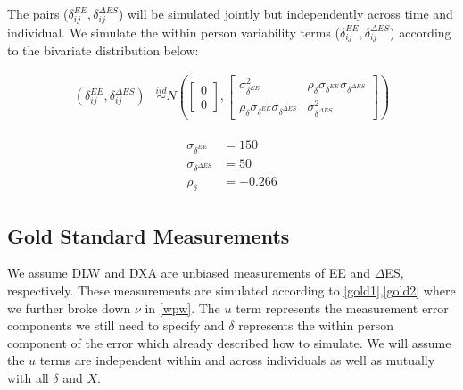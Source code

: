 \documentclass[11pt]{article}\usepackage[]{graphicx}\usepackage[]{color}
\begin{document}
The pairs ($\delta_{ij}^{EE},\delta_{ij}^{\Delta ES}$) will be simulated jointly  but independently across time and individual. We simulate the within person variability terms ($\delta_{ij}^{EE},\delta_{ij}^{\Delta ES}$) according to the bivariate distribution below:


\begin{align}
  \label{delta}
  (\delta_{ij}^{EE}, \delta_{ij}^{\Delta ES}) &\overset{iid}{\sim} N\left(
  \begin{bmatrix}
  0\\
  0
  \end{bmatrix}
  ,
  \begin{bmatrix}
  \sigma_{\delta^{EE}}^2 & \rho_{\delta}\sigma_{\delta^{EE}}\sigma_{\delta^{\Delta ES}} \\
   \rho_{\delta}\sigma_{\delta^{EE}}\sigma_{\delta^{\Delta ES}} & \sigma_{\delta^{\Delta ES}}^2
   \end{bmatrix}
  \right)
\end{align}


  \begin{align}
  \begin{split}
    \label{withinvar5}
  \sigma_{\delta^{EE}} &= 150\\
  \sigma_{\delta^{\Delta ES}} &= 50 \\
  \rho_{\delta} &= -0.266
  \end{split}
  \end{align}


\subsection{Gold Standard Measurements}

We assume DLW and DXA are unbiased measurements of EE and $\Delta$ES, respectively. These measurements are simulated according to \eqref{gold1},\eqref{gold2} where we further broke down $\nu$ in \eqref{wpw}.  The $u$ term represents the measurement error components we still need to specify and $\delta$ represents the within person component of the error which already described how to simulate. We will assume the $u$ terms are independent within and across individuals as well as mutually with all $\delta$ and $X$. 
\end{document}
